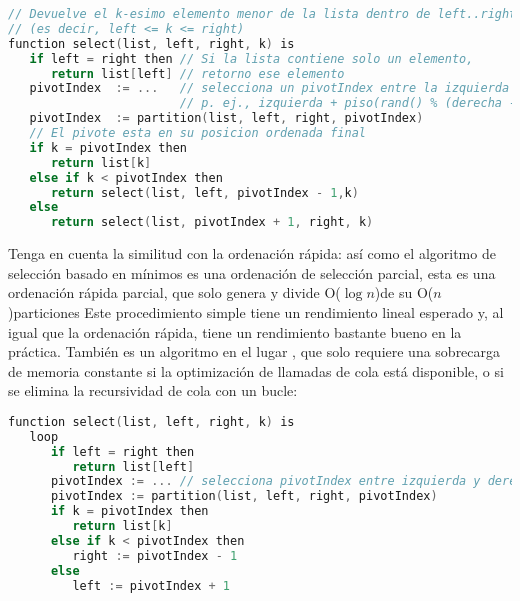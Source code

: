 \begin{lstlisting}[language=C++]
// Devuelve el k-esimo elemento menor de la lista dentro de left..right inclusivo 
// (es decir, left <= k <= right)
function select(list, left, right, k) is
   if left = right then // Si la lista contiene solo un elemento,
      return list[left] // retorno ese elemento
   pivotIndex  := ...   // selecciona un pivotIndex entre la izquierda y derecha
                        // p. ej., izquierda + piso(rand() % (derecha - izquierda + 1))
   pivotIndex  := partition(list, left, right, pivotIndex)
   // El pivote esta en su posicion ordenada final
   if k = pivotIndex then
      return list[k]
   else if k < pivotIndex then
      return select(list, left, pivotIndex - 1,k)
   else
      return select(list, pivotIndex + 1, right, k) 
\end{lstlisting}

Tenga en cuenta la similitud con la ordenación rápida: así como el algoritmo de selección basado en mínimos es una ordenación de selección parcial, esta es una ordenación rápida parcial, que solo genera y divide  O($\log n$)de su O($n$)particiones Este procedimiento simple tiene un rendimiento lineal esperado y, al igual que la ordenación rápida, tiene un rendimiento bastante bueno en la práctica. También es un algoritmo en el lugar , que solo requiere una sobrecarga de memoria constante si la optimización de llamadas de cola está disponible, o si se elimina la recursividad de cola con un bucle:

\begin{lstlisting}[language=C++]
function select(list, left, right, k) is
   loop
      if left = right then
         return list[left]
      pivotIndex := ... // selecciona pivotIndex entre izquierda y derecha
      pivotIndex := partition(list, left, right, pivotIndex)
      if k = pivotIndex then
         return list[k]
      else if k < pivotIndex then
         right := pivotIndex - 1
      else
         left := pivotIndex + 1
\end{lstlisting}


